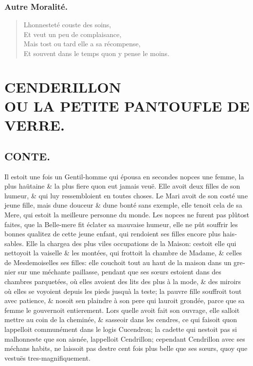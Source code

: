 \documentclass[14pt,a4paper]{memoir}
\begin{document}
\begin{otherlanguage}{french}
\begin{verse}
\end{verse}

\subsection{Autre Moralité.}

\begin{verse}
  \small
L\textquotesingle honnesteté couste des soins, \\
Et veut un peu de complaisance, \\
Mais tost ou tard elle a sa récompense, \\
Et souvent dans le temps qu\textquotesingle on y pense le moins.
\end{verse}

\chapter[CENDERILLION]{CENDERILLON\\ [1ex] \large OU LA PETITE PANTOUFLE DE VERRE.}

\section{CONTE.}

Il estoit une fois un Gentil-homme qui épousa en secondes nopces une
femme, la plus haütaine \& la plus fiere qu\textquotesingle on eut
jamais veuë. Elle avoit deux filles de son humeur, \& qui luy
ressembloient en toutes choses. Le Mari avoit de son costé une jeune
fille, mais d\textquotesingle une douceur \& d\textquotesingle une bonté
sans exemple, elle tenoit cela de sa Mere, qui estoit la meilleure
personne du monde. Les nopces ne furent pas plûtost faites, que la
Belle-mere fit éclater sa mauvaise humeur, elle ne pût souffrir les
bonnes qualitez de cette jeune enfant, qui rendoient ses filles encore
plus haissables. Elle la chargea des plus viles occupations de la
Maison: c\textquotesingle estoit elle qui nettoyoit la vaiselle \& les
montées, qui frottoit la chambre de Madame, \& celles de Mesdemoiselles
ses filles: elle couchoit tout au haut de la maison dans un grenier sur
une méchante paillasse, pendant que ses sœurs estoient dans des chambres
parquetées, où elles avoient des lits des plus à la mode, \& des miroirs
où elles se voyoient depuis les pieds jusqu\textquotesingle à la teste;
la pauvre fille souffroit tout avec patience, \& n\textquotesingle osoit
s\textquotesingle en plaindre à son pere qui l\textquotesingle auroit
grondée, parce que sa femme le gouvernoit entierement. Lors quelle avoit
fait son ouvrage, elle s\textquotesingle alloit mettre au coin de la
cheminée, \& s\textquotesingle asseoir dans les cendres, ce qui faisoit
qu\textquotesingle on l\textquotesingle appelloit communément dans le
logis Cucendron; la cadette qui n\textquotesingle estoit pas si
malhonneste que son aisnée, l\textquotesingle appelloit Cendrillon;
cependant Cendrillon avec ses méchans habits, ne laissoit pas
d\textquotesingle estre cent fois plus belle que ses sœurs, quoy que
vestuës tres-magnifiquement.


\end{otherlanguage}
\end{document}

